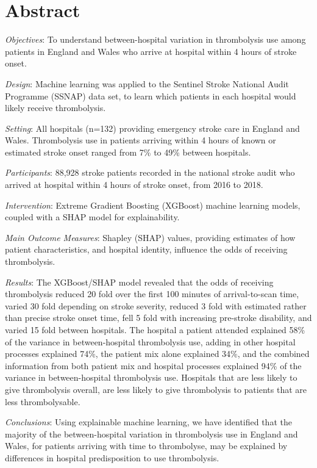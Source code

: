 \section*{Abstract}

\emph{Objectives}: To understand between-hospital variation in thrombolysis use among patients in England and Wales who arrive at hospital within 4 hours of stroke onset.

\emph{Design}: Machine learning was applied to the Sentinel Stroke National Audit Programme (SSNAP)  data set, to learn which patients in each hospital would likely receive thrombolysis.

\emph{Setting}: All hospitals (n=132) providing emergency stroke care in England and Wales. Thrombolysis use in patients arriving within 4 hours of known or estimated stroke onset ranged from 7\% to 49\% between hospitals.

\emph{Participants}: 88,928 stroke patients recorded in the national stroke audit who arrived at hospital within 4 hours of stroke onset, from 2016 to 2018.

\emph{Intervention}: Extreme Gradient Boosting (XGBoost) machine learning models, coupled with a SHAP model for explainability.

\emph{Main Outcome Measures}: Shapley (SHAP) values, providing estimates of how patient characteristics, and hospital identity, influence the odds of receiving thrombolysis.

\emph{Results}: The XGBoost/SHAP model revealed that the odds of receiving thrombolysis reduced 20 fold over the first 100 minutes of arrival-to-scan time, varied 30 fold depending on stroke severity, reduced 3 fold with estimated rather than precise stroke onset time, fell 5 fold with increasing pre-stroke disability, and varied 15 fold between hospitals. The hospital a patient attended explained 58\% of the variance in between-hospital thrombolysis use, adding in other hospital processes explained 74\%, the patient mix alone explained 34\%, and the combined information from both patient mix and hospital processes explained 94\% of the variance in between-hospital thrombolysis use. Hospitals that are less likely to give thrombolysis overall, are less likely to give thrombolysis to patients that are less thrombolysable.%

\emph{Conclusions}: Using explainable machine learning, we have identified that the majority of the between-hospital variation in thrombolysis use in England and Wales, for patients arriving with time to thrombolyse, may be explained by differences in hospital predisposition to use thrombolysis.
